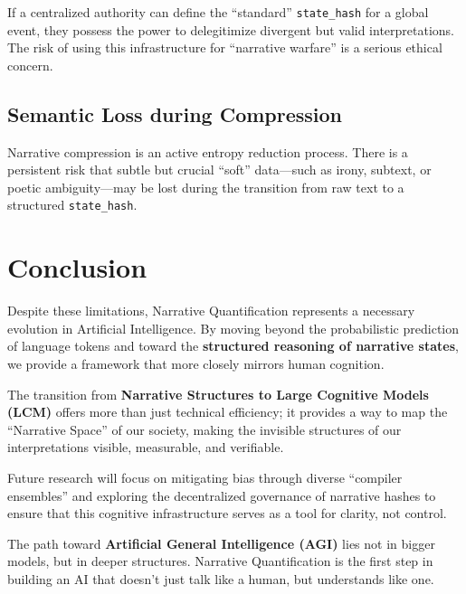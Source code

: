 \documentclass[11pt,a4paper]{article}
\begin{document}
If a centralized authority can define the ``standard'' \texttt{state\_hash}
for a global event, they possess the power to delegitimize divergent
but valid interpretations. The risk of using this infrastructure for
``narrative warfare'' is a serious ethical concern.

\subsection{Semantic Loss during Compression}

Narrative compression is an active entropy reduction process. There is a
persistent risk that subtle but crucial ``soft'' data---such as irony,
subtext, or poetic ambiguity---may be lost during the transition from
raw text to a structured \texttt{state\_hash}.

\section{Conclusion}

Despite these limitations, Narrative Quantification represents a
necessary evolution in Artificial Intelligence. By moving beyond the
probabilistic prediction of language tokens and toward the
\textbf{structured reasoning of narrative states}, we provide a
framework that more closely mirrors human cognition.

The transition from \textbf{Narrative Structures to Large Cognitive
Models (LCM)} offers more than just technical efficiency; it provides a
way to map the ``Narrative Space'' of our society, making the invisible
structures of our interpretations visible, measurable, and verifiable.

Future research will focus on mitigating bias through diverse
``compiler ensembles'' and exploring the decentralized governance of
narrative hashes to ensure that this cognitive infrastructure serves as
a tool for clarity, not control.

The path toward \textbf{Artificial General Intelligence (AGI)} lies not
in bigger models, but in deeper structures. Narrative Quantification is
the first step in building an AI that doesn't just talk like a human,
but understands like one.
\end{document}

